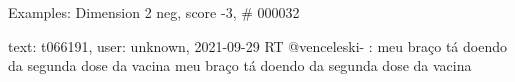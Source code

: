 \begin{frame}{Examples: Dimension 2 neg, score -3, \# 000032}
\footnotesize
\begin{alertblock}{text: t066191, user: unknown, 2021-09-29}
RT @venceleski- : meu braço tá doendo da segunda dose da vacina 
   
 meu braço tá doendo da segunda dose da vacina 
\textbf{} 
\textbf{}  
  
\end{alertblock}
\end{frame}
